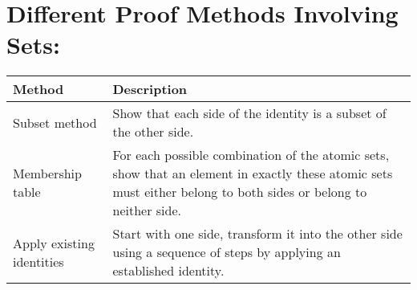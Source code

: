 \documentclass{exam}
\begin{document}
\section{Different Proof Methods Involving Sets:}
\begin{tabular}{|l|p{10cm}|}
\hline
\textbf{Method} & \textbf{Description} \\
\hline
Subset method & Show that each side of the identity is a subset of the other side. \\
\hline
Membership table & For each possible combination of the atomic sets, show that an element in exactly these atomic sets must either belong to both sides or belong to neither side. \\
\hline
Apply existing identities & Start with one side, transform it into the other side using a sequence of steps by applying an established identity. \\
\hline
\end{tabular}
\vspace{5mm}
\end{document}
